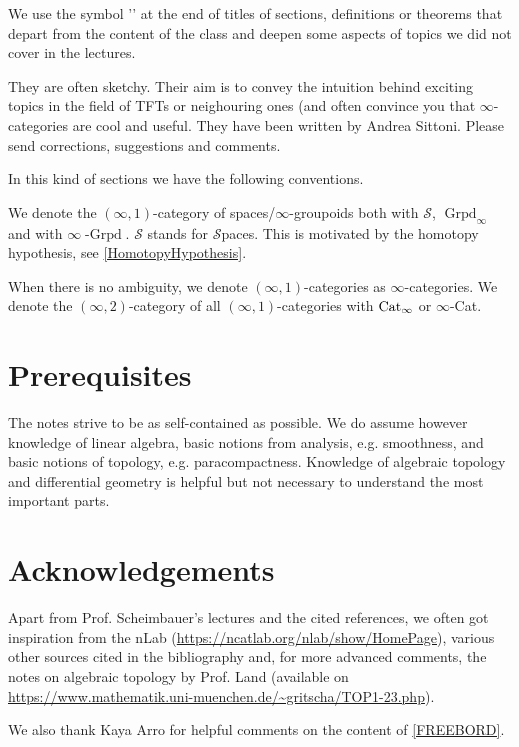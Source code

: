\begin{notat}[\extra]
    We use the symbol '\extra' at the end of titles of sections, definitions or theorems that depart from the
    content of the class and deepen some aspects of topics we did not cover in the lectures.
    
    They are often sketchy. Their aim is to convey the intuition behind exciting topics in the field of TFTs
     or neighouring ones (and often
    convince you that $\infty$-categories are cool and useful. They have been written by Andrea Sittoni.
    Please send corrections, suggestions and comments.
\end{notat}
In this kind of sections we have the following conventions.
\begin{notat}
We denote the $(\infty,1)$-category of spaces/$\infty$-groupoids both with $\mathscr{S}$,
 $\operatorname{Grpd}_\infty$ and with $\infty\operatorname{-Grpd}$. $\mathscr{S}$ stands for 
 $\mathscr{S}$paces. This is motivated by the
  homotopy hypothesis, see \ref{HomotopyHypothesis}.
\end{notat}
\begin{notat}
When there is no ambiguity, we denote $(\infty,1)$-categories as $\infty$-categories. We denote the
$(\infty,2)$-category of all $(\infty,1)$-categories with $\operatorname{Cat}_\infty$ or $\infty$-Cat.
\end{notat}
\section*{Prerequisites}
The notes strive to be as self-contained as possible. We do assume however knowledge of linear algebra,
basic notions from analysis, e.g. smoothness, and basic notions of topology, e.g. 
paracompactness. Knowledge of algebraic topology and differential geometry is helpful but not necessary to understand the
most important parts.
\section*{Acknowledgements}
Apart from Prof. Scheimbauer's lectures and the cited references,
we often got inspiration from the nLab (\url{https://ncatlab.org/nlab/show/HomePage}), various other sources cited in the bibliography and, for more advanced comments, the notes
on algebraic topology by Prof. Land (available on \url{https://www.mathematik.uni-muenchen.de/~gritscha/TOP1-23.php}).

\noindent We also thank Kaya Arro for helpful comments on the content of \ref{FREEBORD}.
\thispagestyle{empty}
\hfill
\vspace{0.50cm}
\textcolor{black}{\tableofcontents}